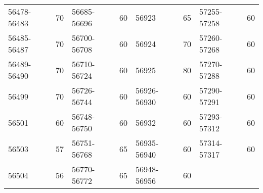 \begin{center}
\begin{singlespacing}
\begin{longtable}{lr|lr|lr|lr}
56478-56483 	&	70	&	 56685-56696 	&	60	&	56923	&	65	&	 57255-57258 	&	60	\\
56485-56487 	&	70	&	 56700-56708 	&	60	&	56924	&	70	&	 57260-57268 	&	60	\\
56489-56490 	&	70	&	 56710-56724 	&	60	&	56925	&	80	&	 57270-57288 	&	60	\\
56499	&	70	&	 56726-56744 	&	60	&	 56926-56930 	&	60	&	 57290-57291 	&	60	\\
56501	&	60	&	 56748-56750 	&	60	&	56932	&	60	&	 57293-57312 	&	60	\\
56503	&	57	&	 56751-56768 	&	65	&	 56935-56940 	&	60	&	 57314-57317 	&	60	\\
56504	&	56	&	 56770-56772 	&	65	&	 56948-56956 	&	60	&	  	&	  	\\

\end{longtable}
\end{singlespacing}
\end{center}
\vspace{20pt}